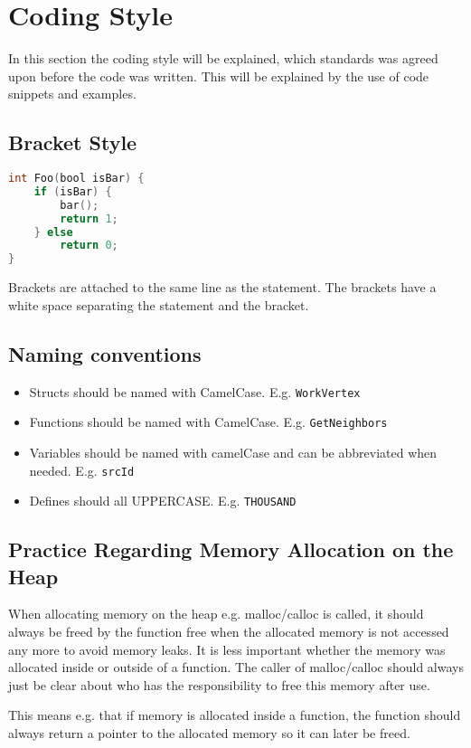 \section{Coding Style}

In this section the coding style will be explained, which standards was agreed upon before the code was written. This will be explained by the use of code snippets and examples. 

\subsection{Bracket Style}

\begin{lstlisting}[style=customc, language=C]
int Foo(bool isBar) {
    if (isBar) {
        bar();
        return 1;
    } else
        return 0;
}
\end{lstlisting}

Brackets are attached to the same line as the statement. The brackets have a white space separating the statement and the bracket.

\subsection{Naming conventions}

\begin{itemize}
	\item Structs should be named with CamelCase. E.g. \texttt{WorkVertex}
	\item Functions should be named with CamelCase. E.g. \texttt{GetNeighbors}
	\item Variables should be named with camelCase and can be abbreviated when needed. E.g. \texttt{srcId}
    \item Defines should all UPPERCASE. E.g. \texttt{THOUSAND}
\end{itemize}

\subsection{Practice Regarding Memory Allocation on the Heap}
When allocating memory on the heap e.g. malloc/calloc is called, it should always be freed by the function free when the allocated memory is not accessed any more to avoid memory leaks. It is less important whether the memory was allocated inside or outside of a function. The caller of malloc/calloc should always just be clear about who has the responsibility to free this memory after use. 

This means e.g. that if memory is allocated inside a function, the function should always return a pointer to the allocated memory so it can later be freed.